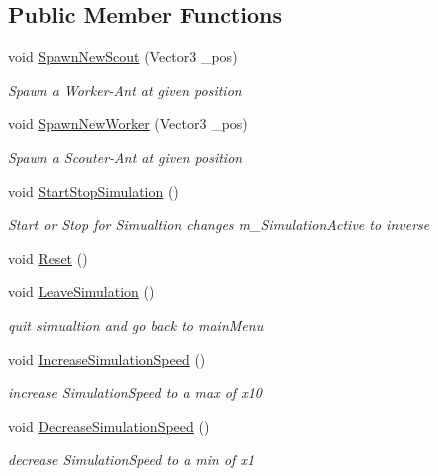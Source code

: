 \subsection*{Public Member Functions}
\begin{DoxyCompactItemize}
\item 
void \mbox{\hyperlink{class_colony_manager_a6f16173095c6022fa35742883f6c8e45}{Spawn\+New\+Scout}} (Vector3 \+\_\+pos)
\begin{DoxyCompactList}\small\item\em Spawn a Worker-\/\+Ant at given position \end{DoxyCompactList}\item 
void \mbox{\hyperlink{class_colony_manager_ab8d9246488bc5ccb35cca453a3b4db11}{Spawn\+New\+Worker}} (Vector3 \+\_\+pos)
\begin{DoxyCompactList}\small\item\em Spawn a Scouter-\/\+Ant at given position \end{DoxyCompactList}\item 
void \mbox{\hyperlink{class_colony_manager_a839590052f5e40b36f4902a7f76c1fd0}{Start\+Stop\+Simulation}} ()
\begin{DoxyCompactList}\small\item\em Start or Stop for Simualtion changes m\+\_\+\+Simulation\+Active to inverse \end{DoxyCompactList}\item 
void \mbox{\hyperlink{class_colony_manager_affb94ecd21092f1ae1dd0c07877c1765}{Reset}} ()
\item 
void \mbox{\hyperlink{class_colony_manager_a48d7c987e2198265291eead3e8b50a9f}{Leave\+Simulation}} ()
\begin{DoxyCompactList}\small\item\em quit simualtion and go back to main\+Menu \end{DoxyCompactList}\item 
void \mbox{\hyperlink{class_colony_manager_ad907cd27800161d113a4a9bbe2dd802c}{Increase\+Simulation\+Speed}} ()
\begin{DoxyCompactList}\small\item\em increase Simulation\+Speed to a max of x10 \end{DoxyCompactList}\item 
void \mbox{\hyperlink{class_colony_manager_a855eba1e89594c5b6c7d24bf70fa6c23}{Decrease\+Simulation\+Speed}} ()
\begin{DoxyCompactList}\small\item\em decrease Simulation\+Speed to a min of x1 \end{DoxyCompactList}\end{DoxyCompactItemize}
